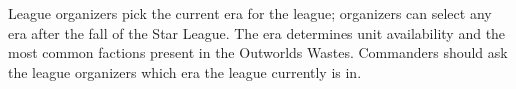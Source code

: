League organizers pick the current era for the league; organizers can select any era after the fall of the Star League.
The era determines unit availability and the most common factions present in the Outworlds Wastes.
Commanders should ask the league organizers which era the league currently is in.
